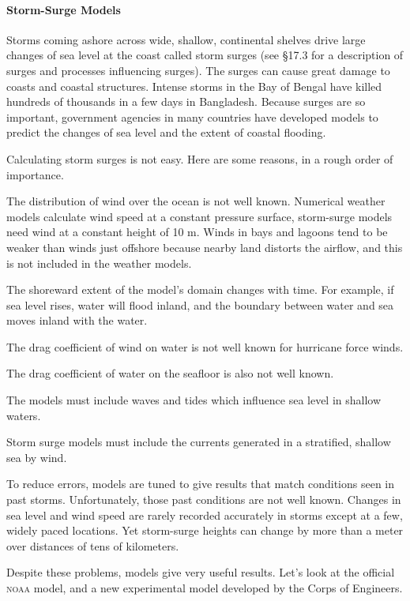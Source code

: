 \paragraph{Storm-Surge Models}
Storms coming ashore across wide, shallow, continental shelves drive large changes of sea
level at the coast called storm surges (see \S 17.3 for a description
of surges and processes influencing surges). The surges can cause
great damage to coasts and coastal structures. Intense storms in the
Bay of Bengal have killed hundreds of thousands in a few days in
Bangladesh. Because surges are so important, government agencies in
many countries have developed models to predict the changes of sea
level and the extent of coastal flooding.

Calculating storm surges is not easy. Here are some reasons, in a
rough order of importance.
\begin{enumerate}
\vitem The distribution of wind over the ocean is not well
known. Numerical weather models calculate wind speed at a constant
pressure surface, storm-surge models need wind at a constant height of
10 m. Winds in bays and lagoons tend to be weaker than winds just
offshore because nearby land distorts the airflow, and this is not
included in the weather models.

\vitem The shoreward extent of the model's domain changes with
time. For example, if sea level rises, water will flood inland, and
the boundary between water and sea moves inland with the water.

\vitem The drag coefficient of wind on water
is not well known for hurricane force winds.

\vitem The drag coefficient of water on the
seafloor is also not well known.

\vitem The models must include waves and tides which influence sea
level in shallow waters.

\vitem Storm surge models must include the currents generated in a
stratified, shallow sea by wind.
\end{enumerate}
To reduce errors, models are tuned to give results that match
conditions seen in past storms. Unfortunately, those past conditions
are not well known. Changes in sea level and wind speed are rarely
recorded accurately in storms except at a few, widely paced
locations. Yet storm-surge heights can change by more than a meter
over distances of tens of kilometers.

Despite these problems, models give very useful results. Let's look at
the official \textsc{noaa} model, and a new experimental model
developed by the Corps of Engineers.

